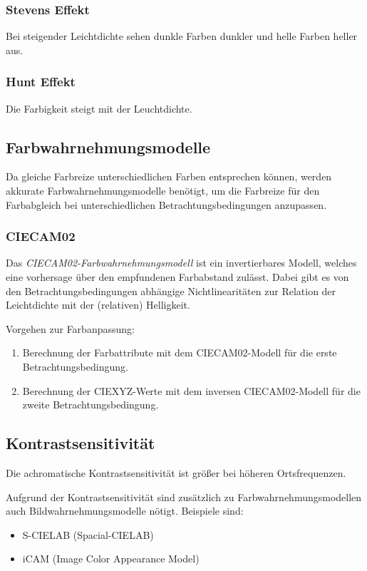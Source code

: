 \documentclass[a4paper, 11pt, accentcolor = tud3b]{tudreport}
\begin{document}
				\subsubsection{Stevens Effekt}
					Bei steigender Leichtdichte sehen dunkle Farben dunkler und helle Farben heller aus.

				\subsubsection{Hunt Effekt}
					Die Farbigkeit steigt mit der Leuchtdichte.

			\subsection{Farbwahrnehmungsmodelle}
				Da gleiche Farbreize unterschiedlichen Farben entsprechen können, werden akkurate Farbwahrnehmungsmodelle benötigt, um die Farbreize für den Farbabgleich bei unterschiedlichen Betrachtungsbedingungen anzupassen.

				\subsubsection{CIECAM02}
					Das \emph{CIECAM02-Farbwahrnehmungsmodell} ist ein invertierbares Modell, welches eine vorhersage über den empfundenen Farbabstand zulässt. Dabei gibt es von den Betrachtungsbedingungen abhängige Nichtlinearitäten zur Relation der Leichtdichte mit der (relativen) Helligkeit.
					
					Vorgehen zur Farbanpassung:
					\begin{enumerate}
						\item Berechnung der Farbattribute mit dem CIECAM02-Modell für die erste Betrachtungsbedingung.
						\item Berechnung der CIEXYZ-Werte mit dem inversen CIECAM02-Modell für die zweite Betrachtungsbedingung.
					\end{enumerate}

			\subsection{Kontrastsensitivität}
				Die achromatische Kontrastsensitivität ist größer bei höheren Ortsfrequenzen.
				
				Aufgrund der Kontrastsensitivität sind zusätzlich zu Farbwahrnehmungsmodellen auch Bildwahrnehmungsmodelle nötigt. Beispiele sind:
				\begin{itemize}
					\item S-CIELAB (Spacial-CIELAB)
					\item iCAM (Image Color Appearance Model)
				\end{itemize}
\end{document}
